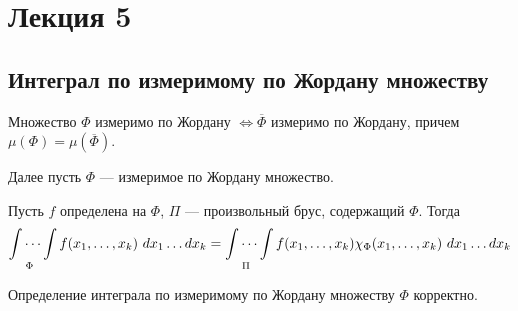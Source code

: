 \section{Лекция 5}
\subsection{Интеграл по измеримому по Жордану множеству}
\begin{comm}
    Множество $\Phi$ измеримо по Жордану $\Leftrightarrow \overline{\Phi}$ измеримо по Жордану, причем $\mu(\Phi)=\mu(\overline{\Phi})$. 
\end{comm}
\noindent Далее пусть $\Phi$ --- измеримое по Жордану множество.
\begin{definition}
    Пусть $f$ определена на $\Phi$, $\Pi$ --- произвольный брус, содержащий $\Phi$. Тогда
    \[\idotsint\limits_{\Phi} f(x_1,\dots,x_k)\ dx_1\dots dx_k=\idotsint\limits_{\Pi} f(x_1,\dots,x_k)\chi_{\Phi}(x_1,\dots,x_k)\ dx_1\dots dx_k\]
\end{definition}
\begin{statement}
    Определение интеграла по измеримому по Жордану множеству $\Phi$ корректно.
\end{statement}

